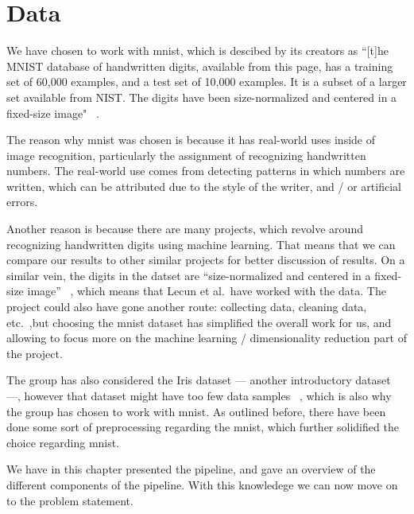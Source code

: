 \section{Data}
We have chosen to work with \gls{mnist}, which is descibed by its creators as
``[t]he MNIST database of handwritten digits, available from this page, has a training set of 60,000 examples, and a test set of 10,000 examples. It is a subset of a larger set available from NIST. The digits have been size-normalized and centered in a fixed-size image" ~\cite{lecun-mnist-database}.


The reason why \gls{mnist} was chosen is because it has real-world uses inside of image recognition, particularly the assignment of recognizing handwritten numbers. The real-world use comes from detecting patterns in which numbers are written, which can be attributed due to the style of the writer, and / or artificial errors.


Another reason is because there are many projects, which revolve around recognizing handwritten digits using machine learning. That means that we can compare our results to other similar projects for better discussion of results. On a similar vein, the digits in the datset are ``size-normalized and centered in a fixed-size image'' ~\cite{lecun-mnist-database}, which means that Lecun et al.\ have worked with the data. The project could also have gone another route: collecting data, cleaning data, etc.\ ,but choosing the \gls{mnist} dataset has simplified the overall work for us, and allowing to focus more on the machine learning / dimensionality reduction part of the project. 


The group has also considered the Iris dataset --- another introductory dataset ---, however that dataset might have too few data samples ~\cite{mnist-vs-iris}, which is also why the group has chosen to work with \gls{mnist}. As outlined before, there have been done some sort of preprocessing regarding the \gls{mnist}, which further solidified the choice regarding \gls{mnist}.


We have in this chapter presented the pipeline, and gave an overview of the different components of the pipeline. With this knowledege we can now move on to the problem statement.

